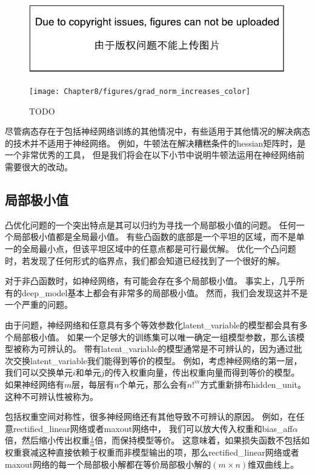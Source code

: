 \begin{figure}[!htb]
\ifOpenSource
\centerline{\includegraphics{figure.pdf}}
\else
\centerline{\texttt{[image: Chapter8/figures/grad\_norm\_increases\_color]}}
\fi
\caption{TODO}
\label{fig:chap8_grad_norm_increases}
\end{figure}



尽管病态存在于包括神经网络训练的其他情况中，有些适用于其他情况的解决病态的技术并不适用于神经网络。
例如，牛顿法在解决糟糕条件的\gls{hessian}矩阵时，是一个非常优秀的工具，
但是我们将会在以下小节中说明牛顿法运用在神经网络前需要很大的改动。

\subsection{局部极小值}
\label{sec:local_minima}
凸优化问题的一个突出特点是其可以归约为寻找一个局部极小值的问题。
任何一个局部极小值都是全局最小值。
有些凸函数的底部是一个平坦的区域，而不是单一的全局最小点，但该平坦区域中的任意点都是可行最优解。
优化一个凸问题时，若发现了任何形式的临界点，我们都会知道已经找到了一个很好的解。


对于非凸函数时，如神经网络，有可能会存在多个局部极小值。
事实上，几乎所有的\gls{deep_model}基本上都会有非常多的局部极小值。
然而，我们会发现这并不是一个严重的问题。

由于问题，神经网络和任意具有多个等效参数化\gls{latent_variable}的模型都会具有多个局部极小值。
如果一个足够大的训练集可以唯一确定一组模型参数，那么该模型被称为可辨认的。
带有\gls{latent_variable}的模型通常是不可辨认的，因为通过批次交换\gls{latent_variable}我们能得到等价的模型。
例如，考虑神经网络的第一层，我们可以交换单元$i$和单元$j$的传入权重向量，传出权重向量而得到等价的模型。
如果神经网络有$m$层，每层有$n$个单元，那么会有$n!^m$方式重新排布\gls{hidden_unit}。
这种不可辨认性被称为。

包括权重空间对称性，很多神经网络还有其他导致不可辨认的原因。
例如，在任意\gls{rectified_linear}网络或者\gls{maxout}网络中，
我们可以放大传入权重和\gls{bias_aff}$\alpha$倍，然后缩小传出权重$\frac{1}{\alpha}$倍，而保持模型等价。
这意味着，如果损失函数不包括如权重衰减这种直接依赖于权重而非模型输出的项，那么\gls{rectified_linear}网络或者\gls{maxout}网络的每一个局部极小解都在等价局部极小解的$(m\times n)$维双曲线上。

